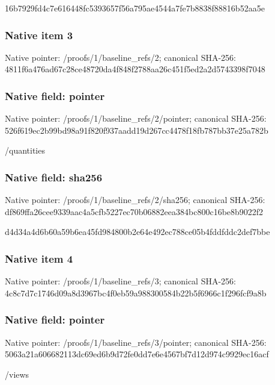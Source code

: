 \documentclass[10pt,a4paper]{article}
\begin{document}
\begingroup\raggedright\sloppy 16b7929fd4c7e616448fc5393657f56a795ae4544a7fe7b8838f88816b52aa5e\par\endgroup

\subsubsection{Native item 3}
Native pointer: /proofs/1/baseline\_\allowbreak{}refs/2; canonical SHA-256: 4811f6a476ad67c28ce48720da4f848f2788aa26c451f5ed2a2d5743398f7048

\subsubsection{Native field: pointer}
Native pointer: /proofs/1/baseline\_\allowbreak{}refs/2/pointer; canonical SHA-256: 526f619ec2b99bd98a91f820f937aadd19d267cc4478f18fb787bb37e25a782b

\begingroup\raggedright\sloppy /\allowbreak{}quantities\par\endgroup

\subsubsection{Native field: sha256}
Native pointer: /proofs/1/baseline\_\allowbreak{}refs/2/sha256; canonical SHA-256: df869ffa26cee9339aac4a5cfb5227ec70b06882eea384bc800c16be8b9022f2

\begingroup\raggedright\sloppy d4d34a4d6b60a59b6ea45fd984800b2e64e492ec788ce05b4fddfddc2def7bbe\par\endgroup

\subsubsection{Native item 4}
Native pointer: /proofs/1/baseline\_\allowbreak{}refs/3; canonical SHA-256: 4c8c7d7c1746d09a8d3967bc4f0eb59a988300584b22b5f6966c1f296fcf9a8b

\subsubsection{Native field: pointer}
Native pointer: /proofs/1/baseline\_\allowbreak{}refs/3/pointer; canonical SHA-256: 5063a21a606682113dc69ed6b9d72fe0dd7e6e4567bf7d12d974c9929ec16acf

\begingroup\raggedright\sloppy /\allowbreak{}views\par\endgroup
\end{document}

